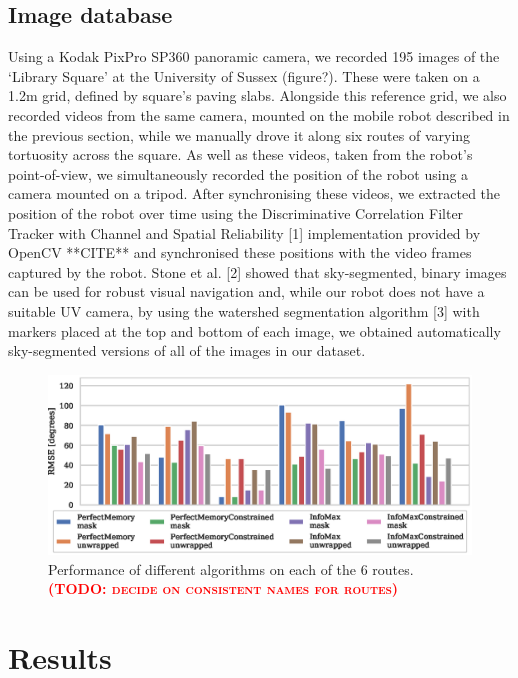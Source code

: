 \documentclass[letterpaper]{article}
\newcommand{\todo}[1]{\textbf{\textsc{\textcolor{red}{(TODO: #1)}}}}
\begin{document}
\subsection{Image database}
Using a Kodak PixPro SP360 panoramic camera, we recorded 195 images of the ‘Library Square’ at the University of Sussex (figure?). 
These were taken on a 1.2m grid, defined by square’s paving slabs. 
Alongside this reference grid, we also recorded videos from the same camera, mounted on the mobile robot described in the previous section, while we manually drove it along six routes of varying tortuosity across the square. 
As well as these videos, taken from the robot’s point-of-view, we simultaneously recorded the position of the robot using a camera mounted on a tripod. 
After synchronising these videos, we extracted the position of the robot over time using the Discriminative Correlation Filter Tracker with Channel and Spatial Reliability [1] implementation provided by OpenCV **CITE** and synchronised these positions with the video frames captured by the robot. 
Stone et al. [2] showed that sky-segmented, binary images can be used for robust visual navigation and, while our robot does not have a suitable UV camera, by using the watershed segmentation algorithm [3] with markers placed at the top and bottom of each image, we obtained automatically sky-segmented versions of all of the images in our dataset.

\begin{figure}[t]
    \includegraphics{figures/route_benchmark.eps}
    \caption{Performance of different algorithms on each of the 6 routes. \todo{decide on consistent names for routes}}
    \label{route_benchmark}
\end{figure}

\section{Results}
\end{document}
